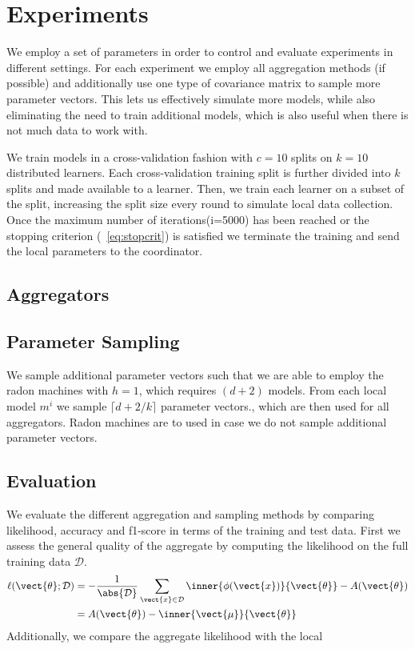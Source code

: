 \section{Experiments}
\label{sec:experiments}
We employ a set of parameters in order to control and evaluate experiments in different settings.
For each experiment we employ all aggregation methods (if possible) and additionally use one type of covariance matrix to sample more parameter vectors. 
This lets us effectively simulate more models, while also eliminating the need to train additional models, which is also useful when there is not much data to work with.

We train models in a cross-validation fashion with $c = 10$ splits on $k=10$ distributed learners.
Each cross-validation training split is further divided into $k$ splits and made available to a learner.
Then, we train each learner on a subset of the split, increasing the split size every round to simulate local data collection.
Once the maximum number of iterations(i=5000) has been reached or the stopping criterion (\eq~\ref{eq:stopcrit}) is satisfied we terminate the training and send the local parameters to the coordinator.

\subsection{Aggregators}
\subsection{Parameter Sampling}
We sample additional parameter vectors such that we are able to employ the radon machines with $h=1$, which requires $(d+2)$ models.
From each local model $m^i$ we sample $\lceil d+2/k \rceil$ parameter vectors., which are then used for all aggregators.
Radon machines are to used in case we do not sample additional parameter vectors.

\subsection{Evaluation}
\label{sec:evaluation}
We evaluate the different aggregation and sampling methods by comparing likelihood, accuracy and f1-score in terms of the training and test data. 
First we assess the general quality of the aggregate by computing the likelihood on the full training data $\mathcal{D}$.
\begin{equation}
    \begin{split}
        \ell(\vect{\theta} ; \mathcal{D}) &= -\frac{1}{\abs{\mathcal{D}}} \sum_{\vect{x} \in \mathcal{D}} \inner{\phi(\vect{x})}{\vect{\theta}} - A(\vect{\theta}) \\    
        &= A(\vect{\theta}) - \inner{\vect{\mu}}{\vect{\theta}}
    \end{split}
\end{equation}
Additionally, we compare the aggregate likelihood with the local 
